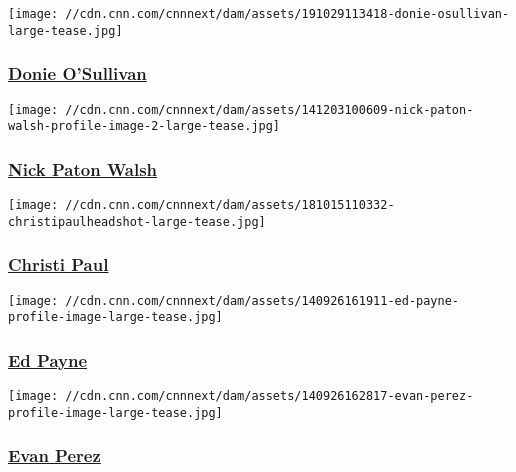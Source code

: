 \href{/profiles/donie-osullivan}{}

\texttt{[image: //cdn.cnn.com/cnnnext/dam/assets/191029113418-donie-osullivan-large-tease.jpg]}

\hypertarget{donie-osullivan}{%
\subsubsection{\texorpdfstring{\href{/profiles/donie-osullivan}{Donie
O'Sullivan}}{Donie O'Sullivan}}\label{donie-osullivan}}

\href{/profiles/nick-paton-walsh}{}

\texttt{[image: //cdn.cnn.com/cnnnext/dam/assets/141203100609-nick-paton-walsh-profile-image-2-large-tease.jpg]}

\hypertarget{nick-paton-walsh}{%
\subsubsection{\texorpdfstring{\href{/profiles/nick-paton-walsh}{Nick
Paton Walsh}}{Nick Paton Walsh}}\label{nick-paton-walsh}}

\href{/profiles/christi-paul}{}

\texttt{[image: //cdn.cnn.com/cnnnext/dam/assets/181015110332-christipaulheadshot-large-tease.jpg]}

\hypertarget{christi-paul}{%
\subsubsection{\texorpdfstring{\href{/profiles/christi-paul}{Christi
Paul}}{Christi Paul}}\label{christi-paul}}

\href{/profiles/ed-payne}{}

\texttt{[image: //cdn.cnn.com/cnnnext/dam/assets/140926161911-ed-payne-profile-image-large-tease.jpg]}

\hypertarget{ed-payne}{%
\subsubsection{\texorpdfstring{\href{/profiles/ed-payne}{Ed
Payne}}{Ed Payne}}\label{ed-payne}}

\href{/profiles/evan-perez-profile}{}

\texttt{[image: //cdn.cnn.com/cnnnext/dam/assets/140926162817-evan-perez-profile-image-large-tease.jpg]}

\hypertarget{evan-perez}{%
\subsubsection{\texorpdfstring{\href{/profiles/evan-perez-profile}{Evan
Perez}}{Evan Perez}}\label{evan-perez}}

